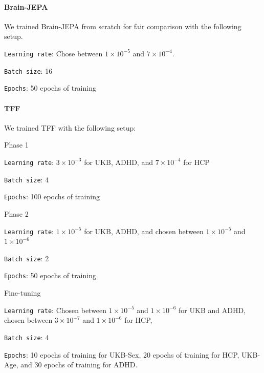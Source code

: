 \paragraph{Brain-JEPA}
We trained Brain-JEPA from scratch for fair comparison with the following setup.
\begin{compactitem}
    \item \texttt{Learning rate}: Chose between $1\times10^{-5}$ and $7 \times 10^{-4}$.
    \item \texttt{Batch size}: 16
    \item \texttt{Epochs}: 50 epochs of training
\end{compactitem}

\paragraph{TFF}
We trained TFF with the following setup:
\begin{compactitem}
    \item Phase 1
    \begin{compactitem}
        \item \texttt{Learning rate}: $3\times10^{-3}$ for UKB, ADHD, and $7\times10^{-4}$ for HCP
        \item \texttt{Batch size}: 4
        \item \texttt{Epochs}: 100 epochs of training
    \end{compactitem}

    \item Phase 2
    \begin{compactitem}
        \item \texttt{Learning rate}: $1\times10^{-5}$ for UKB, ADHD, and chosen between $1\times10^{-5}$ and $1\times10^{-6}$
        \item \texttt{Batch size}: 2
        \item \texttt{Epochs}: 50 epochs of training
    \end{compactitem}

    \item Fine-tuning
    \begin{compactitem}
        \item \texttt{Learning rate}: Chosen between $1\times10^{-5}$ and $1\times10^{-6}$ for UKB and ADHD, chosen between $3\times10^{-7}$ and $1\times10^{-6}$ for HCP, 
        \item \texttt{Batch size}: 4
        \item \texttt{Epochs}: 10 epochs of training for UKB-Sex, 20 epochs of training for HCP, UKB-Age, and 30 epochs of training for ADHD.
    \end{compactitem}
\end{compactitem}

